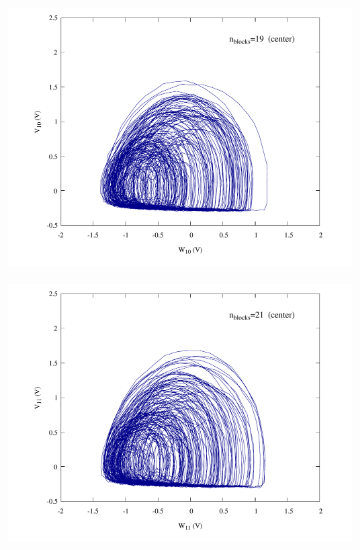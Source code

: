 \begin{figure}
    \centering
    \begin{minipage}{.47\textwidth}
        \begin{subfigure}{\linewidth}
            \centering
            \includegraphics[width=\linewidth]
            {../blocks/19_blocks/middle/attractor.pdf}
        \end{subfigure}
    \end{minipage}
    \begin{minipage}{.47\textwidth}
        \begin{subfigure}{\linewidth}
            \centering
            \includegraphics[width=\linewidth]
            {../blocks/21_blocks/middle/attractor.pdf}

\end{subfigure}
\end{minipage}
\end{figure}
